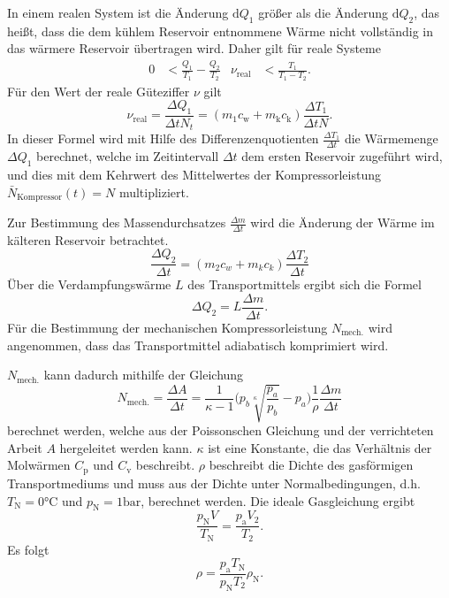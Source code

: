 In einem realen System ist die Änderung $\mathup{d}Q_1$ größer als die Änderung $\mathup{d}Q_2$, das heißt, dass die dem kühlem Reservoir entnommene Wärme nicht vollständig in das wärmere Reservoir übertragen wird.
Daher gilt für reale Systeme
\begin{align}
	 0 &< \frac{Q_1}{T_1}-\frac{Q_2}{T_2} & \nu_{\text{real}} &< \frac{T_1}{T_1-T_2}.
\end{align}
Für den Wert der reale Güteziffer $\nu$ gilt
\begin{equation}
	\nu_\mathup{real}=\frac{\Delta{Q_1}}{{\Delta{t}}N_t}=(m_1c_\mathup{w}+m_\mathup{k}c_\mathup{k})\frac{\Delta{T_1}}{{\Delta{t}}N}.
	\label{waermemenge/zeitintervall}
\end{equation}
In dieser Formel wird mit Hilfe des Differenzenquotienten $\frac{\Delta{T_1}}{\Delta{t}}$ die Wärmemenge $\Delta{Q_1}$ berechnet, 
welche im Zeitintervall $\Delta{t}$ dem ersten Reservoir zugeführt wird, 
und dies mit dem Kehrwert des Mittelwertes der Kompressorleistung $\bar{N}_\text{Kompressor}(t) = N$ multipliziert.

Zur Bestimmung des Massendurchsatzes $\frac{\Delta{m}}{\Delta{t}}$ wird die Änderung der Wärme im kälteren Reservoir betrachtet.
\begin{equation}
	\frac{\Delta Q_2}{\Delta t} =(m_2 c_w + m_k c_k)\frac{\Delta T_2}{\Delta t}
\label{eq:q2-t-verhaeltnis}
\end{equation}
Über die Verdampfungswärme $L$ des Transportmittels ergibt sich die Formel
\begin{equation}
	\Delta Q_2 =L\frac{\Delta m} {\Delta t}.
\label{eq:verdampfungswaerme}	
\end{equation}
Für die Bestimmung der mechanischen Kompressorleistung $N_\text{mech.}$ wird angenommen, dass das Transportmittel adiabatisch komprimiert wird. 

$N_\text{mech.}$ kann dadurch mithilfe der Gleichung
\begin{equation}
	N_\mathup{mech.}=\frac{\Delta{A}}{\Delta{t}}=\frac{1}{\kappa-1}\biggl(p_b \sqrt[\kappa]{\frac{p_a}{p_b}}-p_a\biggr)\frac{1}{\rho}\frac{\Delta{m}}{\Delta{t}}
\label{eq:kompressorleistung}
\end{equation}
berechnet werden, welche aus der Poissonschen Gleichung und der verrichteten Arbeit $A$ hergeleitet werden kann. 
$\kappa$ ist eine Konstante, die das Verhältnis der Molwärmen $C_\mathup{p}$ und $C_\mathup{v}$ beschreibt. 
$\rho$ beschreibt die Dichte des gasförmigen Transportmediums und muss aus der Dichte unter Normalbedingungen, d.h. $T_\mathup{N}=0\si{\celsius}$ und $p_\mathup{N}=1\si{\bar}$, berechnet werden. 
Die ideale Gasgleichung ergibt
\begin{equation}
	\frac{p_\mathup{N} V}{T_\mathup{N}}=\frac{p_\mathup{a} V_2}{T_2}.
\end{equation}
Es folgt
\begin{equation}
	\rho=\frac{p_\mathup{a}T_\mathup{N}}{p_\mathup{N}T_2}\rho_\mathup{N}.
\label{eq:transportmediumdichte}
\end{equation}
